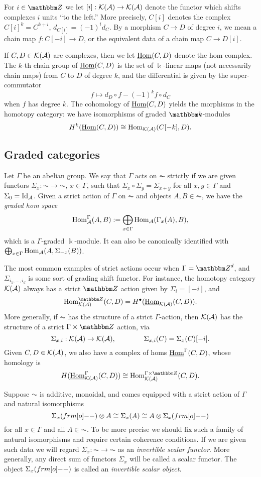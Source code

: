 For $i \in \Z$ we let $[i]:{\mathcal{K}}({\mathcal{A}})\rightarrow {\mathcal{K}}({\mathcal{A}})$ denote the functor which shifts complexes $i$ units ``to the left.''  More precisely, $C[i]$ denotes the complex $C[i]^k=C^{k+i}$, $d_{C[i]}=(-1)^i d_{C}$.  By a morphism $C \to D$ of degree $i$, we mean a chain map $f:C[-i]\to D$, or the equivalent data of a chain map $C \to D[i]$.

If $C,D\in {\mathcal{K}}({\mathcal{A}})$ are complexes, then we let $\underline{\operatorname{Hom}}(C,D)$ denote the hom complex.  The $k$-th chain group of $\underline{\operatorname{Hom}}(C,D)$ is the set of $\Bbbk$-linear maps (not necessarily chain maps) from $C$ to $D$ of degree $k$, and the differential is given by the super-commutator
\[
f\mapsto d_D\circ f  - (-1)^k f\circ d_C
\]
when $f$ has degree $k$. The cohomology of $\underline{\operatorname{Hom}}(C,D)$ yields the morphisms in the homotopy category: we have isomorphisms of graded $\kbbm$-modules
\[
H^k(\underline{\operatorname{Hom}}(C,D))\cong \operatorname{Hom}_{{\mathcal{K}}({\mathcal{A}})}(C[-k],D).
\]

\subsection{Graded categories}
\label{subsec:gradedcats}
Let $\Gamma$ be an abelian group.  We say that $\Gamma$ acts on $\AC$ strictly if we are given functors $\Sigma_x:\AC\rightarrow \AC$, $x\in \Gamma$, such that $\Sigma_x\circ \Sigma_y = \Sigma_{x+y}$ for all $x,y\in \Gamma$ and $\Sigma_0=\operatorname{Id}_{{\mathcal{A}}}$.  Given a strict action of $\Gamma$ on $\AC$ and objects $A,B\in \AC$, we have the \emph{graded hom space}
\[
\operatorname{Hom}^\Gamma_{{\mathcal{A}}}(A,B):=\bigoplus_{x\in \Gamma}\operatorname{Hom}_{{\mathcal{A}}}(\Gamma_x(A),B),
\]
which is a $\Gamma$-graded $\Bbbk$-module. It can also be canonically identified with $\bigoplus_{x\in \Gamma}\operatorname{Hom}_{{\mathcal{A}}}(A,\Sigma_{-x}(B))$.

The most common examples of strict actions occur when $\Gamma = \Z^d$, and $\Sigma_{i_1,\ldots,i_d}$ is some sort of grading shift functor.  For instance, the homotopy category ${\mathcal{K}}({\mathcal{A}})$ always  has a strict $\Z$ action given by $\Sigma_i =[-i]$, and
\[
\Hom^\Z_{\KC(\AC)}(C,D) = H^{\bullet}(\Homc_{\KC(\AC)}(C,D)).
\]
More generally, if $\AC$ has the structure of a strict $\Gamma$-action, then ${\mathcal{K}}({\mathcal{A}})$ has the structure of a strict $\Gamma\times \Z$ action, via
\[
\Sigma_{x,i}:{\mathcal{K}}({\mathcal{A}})\rightarrow {\mathcal{K}}({\mathcal{A}}),\qquad\qquad \Sigma_{x,i}(C) = \Sigma_x(C)[-i].
\]
Given $C,D\in {\mathcal{K}}({\mathcal{A}})$, we also have a complex of homs $\underline{\operatorname{Hom}}^\Gamma(C,D)$, whose homology is
\[
H(\Homc^{\Gamma}_{\KC(\AC)}(C,D)) \cong \Hom_{\KC(\AC)}^{\Gamma\times\Z}(C,D).
\]

Suppose $\AC$ is additive, monoidal, and comes equipped with a strict action of $\Gamma$ and natural isomorphisms
\[
\Sigma_x(\one)\otimes A\cong \Sigma_x(A)\cong A\otimes \Sigma_x(\one)
\]
for all $x\in \Gamma$ and all $A\in \AC$.  To be more precise we should fix such a family of natural isomorphisms and require certain coherence conditions.  If we are given such data we will regard $\Sigma_x:\AC\rightarrow \AC$ as an \emph{invertible scalar functor}.  More generally, any direct sum of functors $\Sigma_x$ will be called a scalar functor. The object $\Sigma_x(\one)$ is called an \emph{invertible scalar object}.

